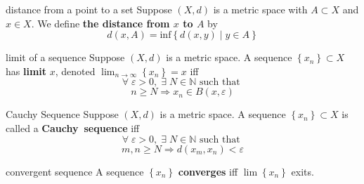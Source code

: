\documentclass[avery5371,grid]{flashcards}
\newcommand{\N}{\mathbb{N}}
\newcommand{\st}{\textrm{ such that }}
\newcommand{\setst}{\; | \;}
\begin{document}
\begin{flashcard}[Definition]{distance from a point to a set}
Suppose $(X,d)$ is a metric space with $A \subset X$ and $x \in X$.  We
define \textbf{the distance from $x$ to $A$} by
\begin{equation*}
d(x,A) = \textrm{inf} \left\{ d(x,y) \setst y \in A \right\}
\end{equation*} 
\end{flashcard}

\begin{flashcard}[Definition]{limit of a sequence}
Suppose $(X,d)$ is a metric space.  A sequence $\left\{ x_n \right\} \subset X$
has \mbox{\textbf{limit}} $x$, denoted 
$\lim_{n \rightarrow \infty}   \left\{ x_n \right\} = x$ iff
\begin{equation*}
\forall \; \varepsilon >0, \; \exists \; N \in \N \st
\end{equation*}
\begin{equation*}
n \geq N \Rightarrow x_n \in B(x,\varepsilon)
\end{equation*}
\end{flashcard}

\begin{flashcard}[Definition]{Cauchy Sequence}
Suppose $(X,d)$ is a metric space.
A sequence $\left\{ x_n \right\} \subset X$ is called a
\mbox{\textbf{Cauchy sequence}} iff
\begin{equation*}
\forall \; \varepsilon >0, \; \exists \; N \in \N \st
\end{equation*}
\begin{equation*}
m,n \geq N \Rightarrow d(x_m,x_n) < \varepsilon
\end{equation*}
\end{flashcard}

\begin{flashcard}[Definition]{convergent sequence}
A sequence $\left\{ x_n \right\}$ \mbox{\textbf{converges}} iff
$\lim \left\{ x_n \right\}$ exits.
\end{flashcard}
\end{document}
